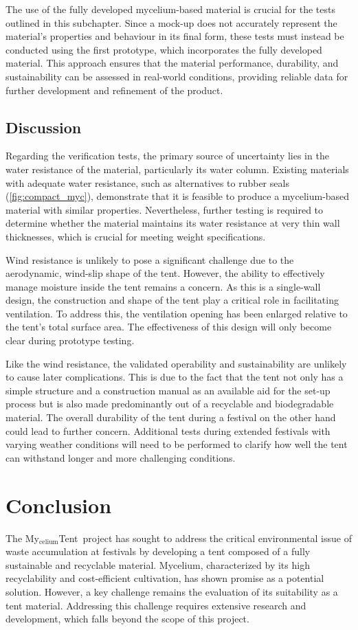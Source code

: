 \documentclass{article}
\newcommand{\myc}{My$_{\text{celium}}$Tent}
\begin{document}
The use of the fully developed mycelium-based material is crucial for the tests outlined
in this subchapter. Since a mock-up does not accurately represent the material's
properties and behaviour in its final form, these tests must instead be conducted using
the first prototype, which incorporates the fully developed material. This approach
ensures that the material performance, durability, and sustainability can be assessed in
real-world conditions, providing reliable data for further development and refinement of
the product.

\subsection{Discussion}
\label{sec:discussion}
Regarding the verification tests, the primary source of uncertainty lies in the water resistance
of the material, particularly its water column. Existing materials with adequate water
resistance, such as alternatives to rubber seals (\autoref{fig:compact_myc}), demonstrate
that it is feasible to produce a mycelium-based material with similar properties. Nevertheless,
further testing is required to determine whether the material maintains its water
resistance at very thin wall thicknesses, which is crucial for meeting weight specifications.

Wind resistance is unlikely to pose a significant challenge due to the aerodynamic, wind-slip
shape of the tent. However, the ability to effectively manage moisture inside the tent remains
a concern. As this is a single-wall design, the construction and shape of the tent play a critical
role in facilitating ventilation. To address this, the ventilation opening has been enlarged
relative to the tent's total surface area. The effectiveness of this design will only become clear
during prototype testing.

Like the wind resistance, the validated operability and sustainability are unlikely to cause later
complications. This is due to the fact that the tent not only has a simple structure and a
construction manual as an available aid for the set-up process but is also made predominantly
out of a recyclable and biodegradable material. The overall durability of the tent during a
festival on the other hand could lead to further concern. Additional tests during extended
festivals with varying weather conditions will need to be performed to clarify how well the
tent can withstand longer and more challenging conditions.

\section{Conclusion}
The \myc\ project has sought to address the critical environmental issue of waste
accumulation at festivals by developing a tent composed of a fully sustainable and recyclable
material. Mycelium, characterized by its high recyclability and cost-efficient cultivation, has
shown promise as a potential solution. However, a key challenge remains the evaluation of its
suitability as a tent material. Addressing this challenge requires extensive research and
development, which falls beyond the scope of this project.
\end{document}
